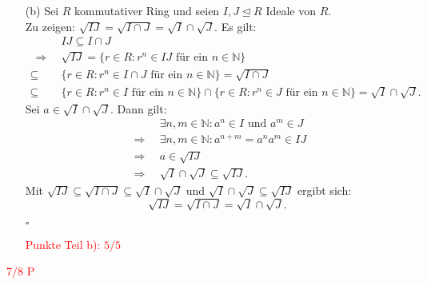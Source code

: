 \documentclass[12pt]{article}
\newcommand{\corr}[1]{\textcolor{red}{#1}}
\newcommand{\QED}{\begin{flushright} $\square$ \end{flushright}}
\newcommand{\df}{\enspace\Longrightarrow\enspace}
\newcommand{\isIdeal}{\trianglelefteq}
\begin{document}
\begin{enumerate}
	\item[(b)] Sei $R$ kommutativer Ring und seien $I,J\isIdeal R$ Ideale von $R$. \\
	Zu zeigen: $\sqrt{IJ}=\sqrt{I\cap J}=\sqrt{I}\cap\sqrt{J}$.
	Es gilt:
	\begin{align*}
		&IJ\subseteq I\cap J \\
		\df &\sqrt{IJ} = \{r\in R:r^n\in IJ\text{ für ein }n\in\mathbb{N}\} \\
		\subseteq&\{r\in R:r^n\in I\cap J\text{ für ein }n\in\mathbb{N}\}=\sqrt{I\cap J} \\
		\subseteq&\{r\in R:r^n\in I\text{ für ein }n\in\mathbb{N}\}\cap\{r\in R:r^n\in J\text{ für ein }n\in\mathbb{N}\}=\sqrt{I}\cap\sqrt{J}.
	\end{align*}
	Sei $a\in\sqrt{I}\cap\sqrt{J}$.	Dann gilt:
	\begin{align*}
		&\exists n,m\in\mathbb{N}:a^n\in I\text{ und }a^m\in J \\
		\df &\exists n,m\in\mathbb{N}:a^{n+m}=a^na^m\in IJ \\
		\df &a\in\sqrt{IJ} \\
		\df &\sqrt{I}\cap\sqrt{J}\subseteq\sqrt{IJ}.
	\end{align*}
	Mit $\sqrt{IJ}\subseteq\sqrt{I\cap J}\subseteq\sqrt{I}\cap\sqrt{J}$ und $\sqrt{I}\cap\sqrt{J}\subseteq\sqrt{IJ}$ ergibt sich:
	$$\sqrt{IJ}=\sqrt{I\cap J}=\sqrt{I}\cap\sqrt{J}.$$
	\QED
\corr{Punkte Teil b): $5/5$}
\end{enumerate}
\corr{$7/8$ P}
\end{document}
